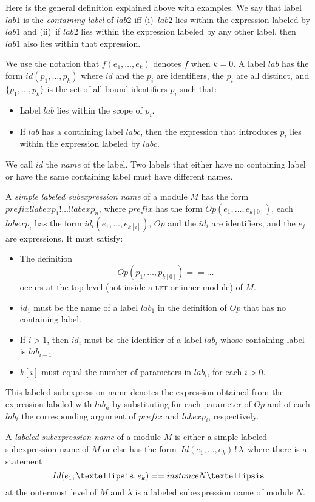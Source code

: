 \documentclass[fleqn,leqno]{article}
\begin{document}
\begin{small}
Here is the general definition explained above with examples.  We say
that label $lab1$ is the \emph{containing label} of $lab2$ iff
(i)~$lab2$ lies within the expression labeled by $lab1$ and (ii)~if
$lab2$ lies within the expression labeled by any other label, then
$lab1$ also lies within that expression.

We use the notation that $f(e_{1}, \ldots, e_{k})$ denotes $f$ when $k=0$.
%
A label $lab$ has the form $id(p_{1},\ldots,p_{k})$ where $id$ and the
$p_{i}$ are identifiers, the $p_{i}$ are all distinct, and
$\{p_{1},\ldots, p_{k}\}$ is the set of all bound identifiers $p_{i}$
such that:
\begin{itemize}
\item Label $lab$ lies within the scope of $p_{i}$.  

\item If $lab$ has a containing label $labc$, then the expression that
introduces $p_{i}$ lies within the expression labeled by $labc$.
\end{itemize}
We call $id$ the \emph{name} of the label.  Two labels that either
have no containing label or have the same containing label must have
different names.


A \emph{simple labeled subexpression name} of a module $M$ has the
form 
 \linebreak
$prefix!labexp_{1}!\ldots!labexp_{n}$, where $prefix$ has the form
$Op(e_{1}, \ldots, e_{k[0]})$, each $labexp_{i}$ has the form
$id_{i}(e_{1}, \ldots, e_{k[i]})$, $Op$ and the $id_{i}$ are
identifiers, and the $e_{j}$ are expressions.  It must satisfy:
\begin{itemize}
\item The definition 
 \[ Op(p_{1}, \ldots, p_{k[0]}) == \ldots \]
occurs at the top level (not inside a \textsc{let} or inner
module) of $M$.

\item $id_{1}$ must be the name of a label $lab_{1}$ in the definition
of $Op$ that has no containing label.

\item If $i>1$, then $id_{i}$ must be the identifier of a label $lab_{i}$
whose containing label is $lab_{i-1}$.

\item $k[i]$ must equal the number of parameters in $lab_{i}$, for
each $i>0$.
\end{itemize}
This labeled subexpression name denotes the expression obtained from
the expression labeled with $lab_{n}$ by substituting for each
parameter of $Op$ and of each $lab_{i}$ the corresponding argument of
$prefix$ and $labexp_{i}$, respectively.

A \emph{labeled subexpression name} of a module $M$ is either a simple
labeled subexpression name of $M$ or else has the form
$\,Id(e_{1},\ldots, e_{k})\,!\,\lambda\,$ where there is a statement
 \[ Id(e_{1}, \ldots, e_{k}) == \INSTANCE N \ldots
 \]
at the outermost level of $M$ and $\lambda$ is a labeled
subexpression name of module $N$.
\end{small}
\end{document}
